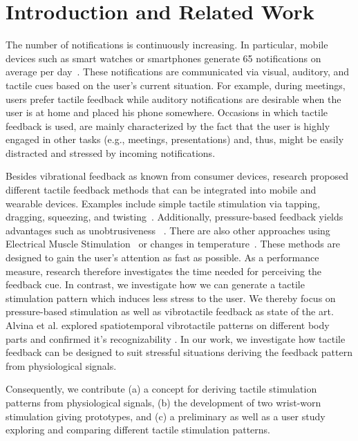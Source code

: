 \section{Introduction and Related Work}


The number of notifications is continuously increasing. In particular, mobile devices such as smart watches or smartphones generate 65 notifications on average per day~\cite{Pielot:2014:ISM:2628363.2628364}. These notifications are communicated via visual, auditory, and tactile cues based on the user's current situation. For example, during meetings, users prefer tactile feedback while auditory notifications are desirable when the user is at home and placed his phone somewhere. Occasions in which tactile feedback is used, are mainly characterized by the fact that the user is highly engaged in other tasks (e.g., meetings, presentations) and, thus, might be easily distracted and stressed by incoming notifications. 

Besides vibrational feedback as known from consumer devices, research proposed different tactile feedback methods that can be integrated into mobile and wearable devices.
Examples include simple tactile stimulation via tapping, dragging, squeezing, and twisting~\cite{nakagaki_LineFORM,6226397}. 
Additionally, pressure-based feedback yields advantages such as unobtrusiveness~ \cite{pohl2015wrist}. 
There are also other approaches using Electrical Muscle Stimulation~\cite{Schneegass:2016:ENI:2957265.2962663} or changes in temperature~\cite{song_Hot}.
These methods are designed to gain the user's attention as fast as possible. As a performance measure, research therefore investigates the time needed for perceiving the feedback cue.
In contrast, we investigate how we can generate a tactile stimulation pattern which induces less stress to the user. 
We thereby focus on pressure-based stimulation as well as vibrotactile feedback as state of the art. Alvina et al. explored spatiotemporal vibrotactile patterns on different body parts and confirmed it's recognizability \cite{alvina2015omnivib}. 
In our work, we investigate how tactile feedback can be designed to suit stressful situations deriving the feedback pattern from physiological signals.

Consequently, we contribute (a) a concept for deriving tactile stimulation patterns from physiological signals, (b) the development of two wrist-worn stimulation giving prototypes, and (c) a preliminary as well as a user study exploring and comparing different tactile stimulation patterns.


 


